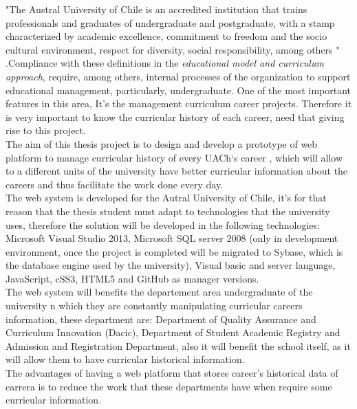 

"The Austral University of Chile is an accredited institution that trains professionals and graduates of undergraduate and postgraduate, with a stamp characterized by academic excellence, commitment to freedom and the socio cultural environment, respect for diversity, social responsibility, among others "\hspace{0.2cm} \cite{MOD07}.Compliance with these definitions in the \textit{educational model and curriculum approach}, require, among others, internal processes of the organization to support educational management, particularly, undergraduate. One of the most important features in this area, It’s the management curriculum career projects. Therefore it is very important to know the curricular history of each career, need that giving rise to this project.
\\

The aim of this thesis project is to design and develop a prototype of web platform to manage curricular history of every UACh‘s career , which will allow to a different units of the university have better curricular information about the careers and thus facilitate the work done every day.
\\

The web system is developed for the Autral University of Chile, it’s for that reason that the thesis student must adapt to technologies that the university uses, therefore the solution will be developed in the following technologies: Microsoft Visual Studio 2013, Microsoft SQL server 2008 (only in development environment, once the project is completed will be migrated to Sybase, which is the database engine used by the university), Visual basic and server language, JavaScript, cSS3, HTML5 and GitHub as manager versions.
\\

The web system will benefits the departement area undergraduate of the university n which they are constantly manipulating curricular careers information, these department are: Department of Quality Assurance and Curriculum Innovation (Dacic), Department of Student Academic Registry and Admission and Registration Department, also it will benefit the school itself, as it will allow them to have curricular historical information.
\\

The advantages of having a web platform that stores career’s historical data of carrera is to reduce the work that these departments have when require some curricular information.